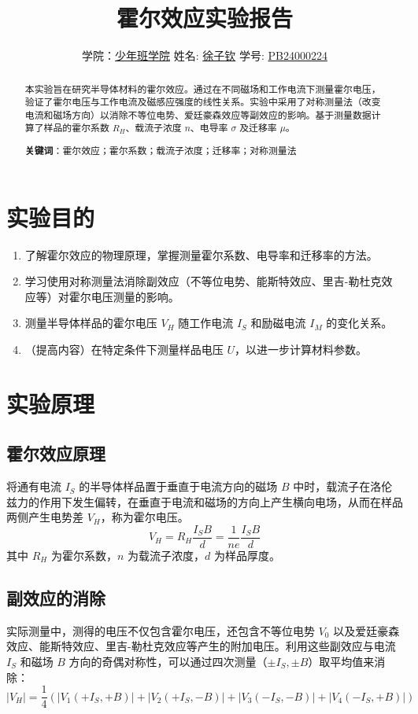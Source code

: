 \documentclass[12pt,a4paper]{article}
\title{\Huge{\textbf{霍尔效应实验报告}}}
\author{学院：\uline{少年班学院} \quad 姓名: \uline{徐子钦} \quad 学号: \uline{PB24000224}}
\begin{document}
\maketitle

\begin{abstract}
本实验旨在研究半导体材料的霍尔效应。通过在不同磁场和工作电流下测量霍尔电压，验证了霍尔电压与工作电流及磁感应强度的线性关系。实验中采用了对称测量法（改变电流和磁场方向）以消除不等位电势、爱廷豪森效应等副效应的影响。基于测量数据计算了样品的霍尔系数 $R_H$、载流子浓度 $n$、电导率 $\sigma$ 及迁移率 $\mu$。

\textbf{关键词}：霍尔效应；霍尔系数；载流子浓度；迁移率；对称测量法
\end{abstract}

\section{实验目的}
\begin{enumerate}
	\item 了解霍尔效应的物理原理，掌握测量霍尔系数、电导率和迁移率的方法。
	\item 学习使用对称测量法消除副效应（不等位电势、能斯特效应、里吉-勒杜克效应等）对霍尔电压测量的影响。
	\item 测量半导体样品的霍尔电压 $V_H$ 随工作电流 $I_S$ 和励磁电流 $I_M$ 的变化关系。
    \item （提高内容）在特定条件下测量样品电压 $U$，以进一步计算材料参数。
\end{enumerate}

\section{实验原理}
\subsection*{霍尔效应原理}
将通有电流 $I_S$ 的半导体样品置于垂直于电流方向的磁场 $B$ 中时，载流子在洛伦兹力的作用下发生偏转，在垂直于电流和磁场的方向上产生横向电场，从而在样品两侧产生电势差 $V_H$，称为霍尔电压。
\[ V_H = R_H \frac{I_S B}{d} = \frac{1}{ne} \frac{I_S B}{d} \]
其中 $R_H$ 为霍尔系数，$n$ 为载流子浓度，$d$ 为样品厚度。

\subsection*{副效应的消除}
实际测量中，测得的电压不仅包含霍尔电压，还包含不等位电势 $V_0$ 以及爱廷豪森效应、能斯特效应、里吉-勒杜克效应等产生的附加电压。利用这些副效应与电流 $I_S$ 和磁场 $B$ 方向的奇偶对称性，可以通过四次测量（$\pm I_S, \pm B$）取平均值来消除：
\[ |V_H| = \frac{1}{4} \left( |V_1(+I_S, +B)| + |V_2(+I_S, -B)| + |V_3(-I_S, -B)| + |V_4(-I_S, +B)| \right) \]
\end{document}

